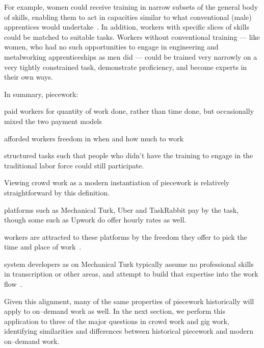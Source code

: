 \documentclass[trackingWork]{subfiles}
\begin{document}
For example, women could receive training in narrow subsets of the general body of skills, enabling them to act in capacities similar to what conventional (male) apprentices would undertake~\cite{hart2013rise}.
In addition, workers with specific slices of skills could be matched to suitable tasks.
Workers without conventional training
--- like women, who had no such opportunities
to engage in engineering and metalworking apprenticeships as men did ---
could be trained very narrowly on a very tightly constrained task,
demonstrate proficiency, and become experts in their own ways.

In summary, piecework:
\begin{inlinelist}[itemjoin*={;~and~},itemjoin={;~}]
  \item paid workers for quantity of work done, rather than time done,
        but occasionally mixed the two payment models
  \item afforded workers freedom in when and how much to work
  \item structured tasks such that people who didn't have the training
        to engage in the traditional labor force could still participate.
\end{inlinelist}

Viewing crowd work as a modern instantiation of piecework is relatively straightforward by this definition.
\begin{Numberlist}
\item platforms such as Mechanical Turk, Uber and TaskRabbit pay by the task, though some such as Upwork do offer hourly rates as well.
\item workers are attracted to these platforms by the freedom they offer to pick the time and place of work~\cite{martin2014being,whyWouldAnyoneBrewer}.
\item system developers as on Mechanical Turk typically assume no professional skills in transcription or other areas, and attempt to build that expertise into the work flow~\cite{noronha2011platemate,bernsteinSoylent}.
\end{Numberlist}
Given this alignment, many of the same properties of piecework historically will apply to on--demand work as well. In the next section, we perform this application to three of the major questions in crowd work and gig work, identifying similarities and differences between historical piecework and modern on--demand work.
\end{document}
